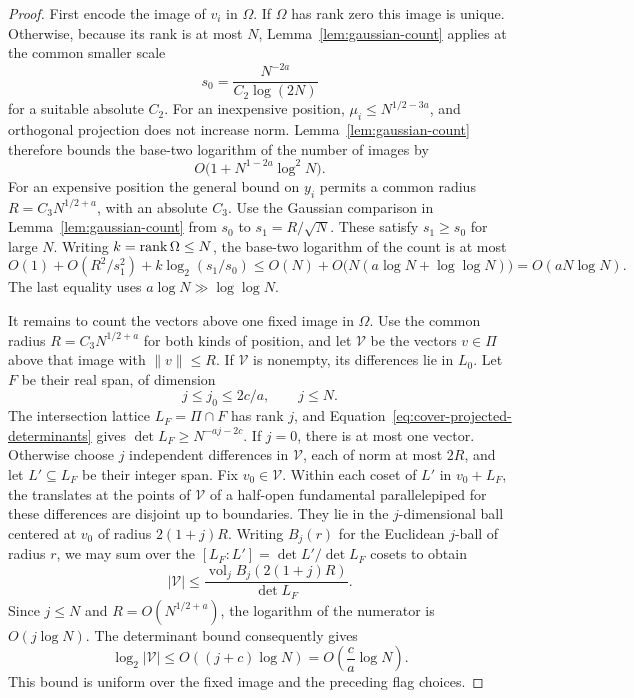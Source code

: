 \begin{proof}
First encode the image of \(v_i\) in \(\Omega\). If \(\Omega\) has
rank zero this image is unique. Otherwise, because its rank is at most
\(N\), Lemma~\ref{lem:gaussian-count} applies at the common smaller
scale
\[
 s_0=\frac{N^{-2a}}{C_2\log(2N)}
\]
for a suitable absolute \(C_2\). For an inexpensive position,
\(\mu_i\le N^{1/2-3a}\), and orthogonal projection does not increase
norm. Lemma~\ref{lem:gaussian-count} therefore bounds the base-two
logarithm of the number of images by
\begin{equation}\label{eq:cover-inexpensive-cost}
 O\bigl(1+N^{1-2a}\log^2N\bigr).
\end{equation}
For an expensive position the general bound on \(y_i\) permits a
common radius \(R=C_3N^{1/2+a}\), with an absolute \(C_3\). Use the
Gaussian comparison in Lemma~\ref{lem:gaussian-count} from \(s_0\)
to \(s_1=R/\sqrt N\). These satisfy \(s_1\ge s_0\) for large \(N\).
Writing \(k=\operatorname{rank}\Omega\le N\), the base-two logarithm of the count is
at most
\[
 O(1)+O(R^2/s_1^2)+k\log_2(s_1/s_0)
 \le O(N)+O\bigl(N(a\log N+\log\log N)\bigr)
 =O(aN\log N).
\]
The last equality uses \(a\log N\gg\log\log N\).

It remains to count the vectors above one fixed image in \(\Omega\).
Use the common radius \(R=C_3N^{1/2+a}\) for both kinds of position,
and let \(\mathcal V\) be the vectors \(v\in\Pi\) above that image with
\(\|v\|\le R\). If \(\mathcal V\) is nonempty, its differences lie in
\(L_0\). Let \(F\) be their real span, of dimension
\[
 j\le j_0\le 2c/a,\qquad j\le N.
\]
The intersection lattice \(L_F=\Pi\cap F\) has rank \(j\), and
Equation~\eqref{eq:cover-projected-determinants} gives
\(\det L_F\ge N^{-aj-2c}\). If \(j=0\), there is at most one vector.
Otherwise choose \(j\) independent differences in \(\mathcal V\),
each of norm at most \(2R\), and let \(L'\subseteq L_F\) be their
integer span. Fix \(v_0\in\mathcal V\). Within each coset of \(L'\)
in \(v_0+L_F\), the translates at the points of \(\mathcal V\) of a
half-open fundamental parallelepiped for these differences are disjoint
up to boundaries. They lie in the \(j\)-dimensional ball centered at
\(v_0\) of radius \(2(1+j)R\). Writing \(B_j(r)\) for the Euclidean
\(j\)-ball of radius \(r\), we may sum over the
\([L_F:L']=\det L'/\det L_F\) cosets to obtain
\[
 |\mathcal V|
 \le \frac{\operatorname{vol}_j B_j(2(1+j)R)}{\det L_F}.
\]
Since \(j\le N\) and \(R=O(N^{1/2+a})\), the logarithm of the
numerator is \(O(j\log N)\). The determinant bound consequently gives
\begin{equation}\label{eq:cover-fiber-cost}
 \log_2|\mathcal V|
 \le O((j+c)\log N)
 =O\left(\frac ca\log N\right).
\end{equation}
This bound is uniform over the fixed image and the preceding flag
choices.


\end{proof}
